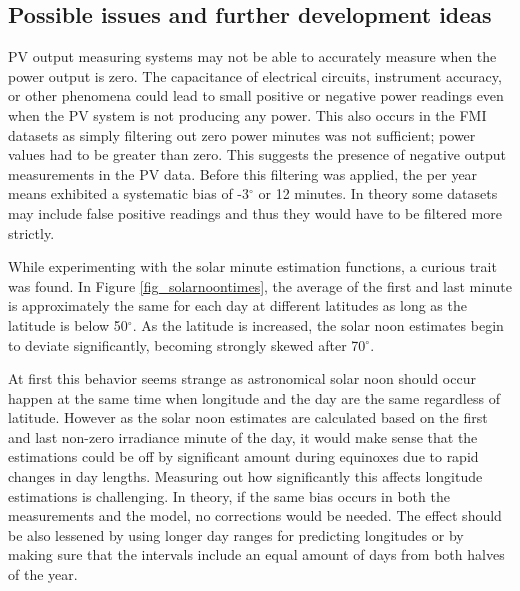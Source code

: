 



\newpage
\subsection{Possible issues and further development ideas}
PV output measuring systems may not be able to accurately measure when the power output is zero. The capacitance of electrical circuits, instrument accuracy, or other phenomena could lead to small positive or negative power readings even when the PV system is not producing any power. This also occurs in the FMI datasets as simply filtering out zero power minutes was not sufficient; power values had to be greater than zero. This suggests the presence of negative output measurements in the PV data. Before this filtering was applied, the per year means exhibited a systematic bias of -3$^\circ$ or 12 minutes. In theory some datasets may include false positive readings and thus they would have to be filtered more strictly.


While experimenting with the solar minute estimation functions, a curious trait was found. In Figure \ref{fig_solarnoontimes}, the average of the first and last minute is approximately the same for each day at different latitudes as long as the latitude is below 50$^\circ$. As the latitude is increased, the solar noon estimates begin to deviate significantly, becoming strongly skewed after 70$^\circ$. 

At first this behavior seems strange as astronomical solar noon should occur happen at the same time when longitude and the day are the same regardless of latitude. However as the solar noon estimates are calculated based on the first and last non-zero irradiance minute of the day, it would make sense that the estimations could be off by significant amount during equinoxes due to rapid changes in day lengths. Measuring out how significantly this affects longitude estimations is challenging. In theory, if the same bias occurs in both the measurements and the model, no corrections would be needed. The effect should be also lessened by using longer day ranges for predicting longitudes or by making sure that the intervals include an equal amount of days from both halves of the year. 

